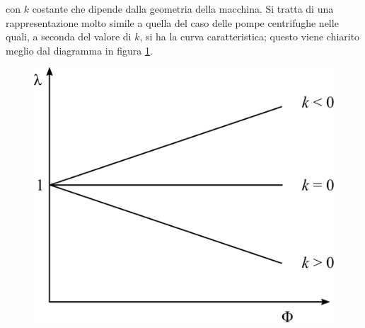 con $k$ costante che dipende dalla geometria della macchina. Si tratta di una rappresentazione molto simile a quella del caso delle pompe centrifughe nelle quali, a seconda del valore di $k$, si ha la curva caratteristica; questo viene chiarito meglio dal diagramma in figura \ref{fig:CondProg}.
\begin{figure}[h!]
\centering
  \includegraphics[width=.4\textwidth]{fig/CondProg.pdf}
\caption{}
\label{fig:CondProg}
\end{figure}

